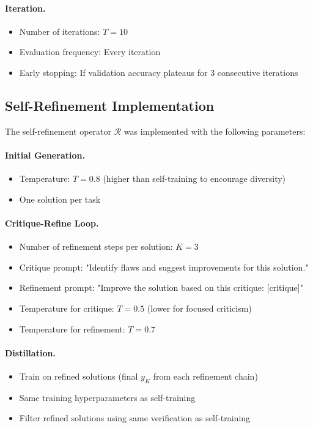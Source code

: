 \documentclass{article}
\theoremstyle{definition}
\theoremstyle{remark}
\begin{document}
\paragraph{Iteration.}
\begin{itemize}
\item Number of iterations: \(T = 10\)
\item Evaluation frequency: Every iteration
\item Early stopping: If validation accuracy plateaus for 3 consecutive iterations
\end{itemize}

\subsection{Self-Refinement Implementation}

The self-refinement operator \(\mathcal{R}\) was implemented with the following parameters:

\paragraph{Initial Generation.}
\begin{itemize}
\item Temperature: \(T = 0.8\) (higher than self-training to encourage diversity)
\item One solution per task
\end{itemize}

\paragraph{Critique-Refine Loop.}
\begin{itemize}
\item Number of refinement steps per solution: \(K = 3\)
\item Critique prompt: "Identify flaws and suggest improvements for this solution."
\item Refinement prompt: "Improve the solution based on this critique: [critique]"
\item Temperature for critique: \(T = 0.5\) (lower for focused criticism)
\item Temperature for refinement: \(T = 0.7\)
\end{itemize}

\paragraph{Distillation.}
\begin{itemize}
\item Train on refined solutions (final \(y_K\) from each refinement chain)
\item Same training hyperparameters as self-training
\item Filter refined solutions using same verification as self-training
\end{itemize}
\end{document}
